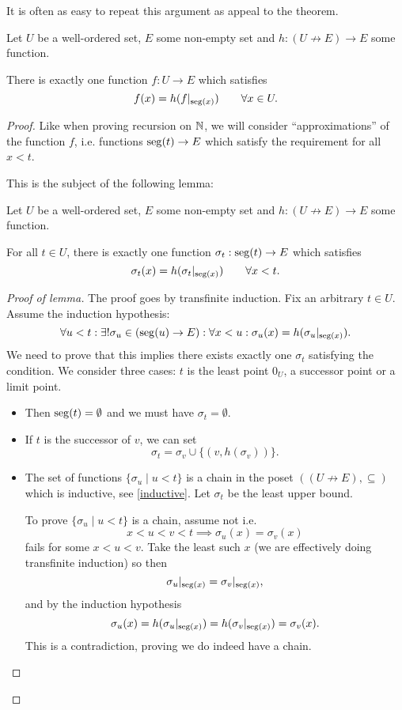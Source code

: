 It is often as easy to repeat this argument as appeal to the theorem.

\begin{theorem}
Let $U$ be a well-ordered set, $E$ some non-empty set and $h: (U\not\to E) \to E$ some function.

There is exactly one function $f:U\to E$ which satisfies
\[ f(x) = h(f|_{\operatorname{seg}(x)}) \qquad \forall x\in U. \]
\end{theorem}
\begin{proof}
Like when proving recursion on $\mathbb{N}$, we will consider ``approximations'' of the function $f$, i.e. functions $\operatorname{seg}(t) \to E$ which satisfy the requirement for all $x<t$.

This is the subject of the following lemma:
\begin{lemma*}
Let $U$ be a well-ordered set, $E$ some non-empty set and $h: (U\not\to E) \to E$ some function.

For all $t\in U$, there is exactly one function $\sigma_t:\operatorname{seg}(t)\to E$ which satisfies
\[ \sigma_t(x) = h(\sigma_t|_{\operatorname{seg}(x)}) \qquad \forall x < t. \]
\end{lemma*}
\begin{proof}[Proof of lemma] \renewcommand{\qedsymbol}{$\dashv$ (Lemma)}
The proof goes by transfinite induction. Fix an arbitrary $t\in U$. Assume the induction hypothesis:
\[ \forall u<t: \exists! \sigma_u\in (\operatorname{seg}(u)\to E): \forall x<u: \sigma_u(x) = h(\sigma_u|_{\operatorname{seg}(x)}). \]
We need to prove that this implies there exists exactly one $\sigma_t$ satisfying the condition. We consider three cases: $t$ is the least point $0_U$, a successor point or a limit point.
\begin{itemize}[leftmargin=2.5cm]
\item[\boxed{t = 0_U}] Then $\operatorname{seg}(t) = \emptyset$ and we must have $\sigma_t = \emptyset$.
\item[\boxed{t = S_U(v)}] If $t$ is the successor of $v$, we can set
\[ \sigma_t = \sigma_v\cup\{ (v,h(\sigma_v)) \}. \]
\item[\boxed{t\in \operatorname{Limit}(U)}] The set of functions $\{\sigma_u\;|\; u<t\}$ is a chain in the poset $((U\not\to E),\subseteq)$ which is inductive, see \ref{inductive}. Let $\sigma_t$ be the least upper bound.

To prove $\{\sigma_u\;|\; u<t\}$ is a chain, assume not i.e.
\[ x<u<v<t \implies \sigma_u(x) = \sigma_v(x) \]
fails for some $x<u<v$. Take the least such $x$ (we are effectively doing transfinite induction) so then
\[ \sigma_u|_{\operatorname{seg}(x)} = \sigma_v|_{\operatorname{seg}(x)}, \]
and by the induction hypothesis
\[ \sigma_u(x) = h(\sigma_u|_{\operatorname{seg}(x)}) = h(\sigma_v|_{\operatorname{seg}(x)}) = \sigma_v(x). \]
This is a contradiction, proving we do indeed have a chain.


\end{itemize}
\end{proof}
\end{proof}
